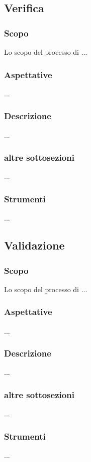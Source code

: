\subsection{Verifica} %
\label{verifica}
    \subsubsection{Scopo}
        Lo scopo del processo di ...
    \subsubsection{Aspettative}
        ...
    \subsubsection{Descrizione}
        ...
    \subsubsection{altre sottosezioni}
        ...
    \subsubsection{Strumenti}
        ...


\subsection{Validazione} %
    \subsubsection{Scopo}
        Lo scopo del processo di ...
    \subsubsection{Aspettative}
        ...
    \subsubsection{Descrizione}
        ...
    \subsubsection{altre sottosezioni}
        ...
    \subsubsection{Strumenti}
        ...